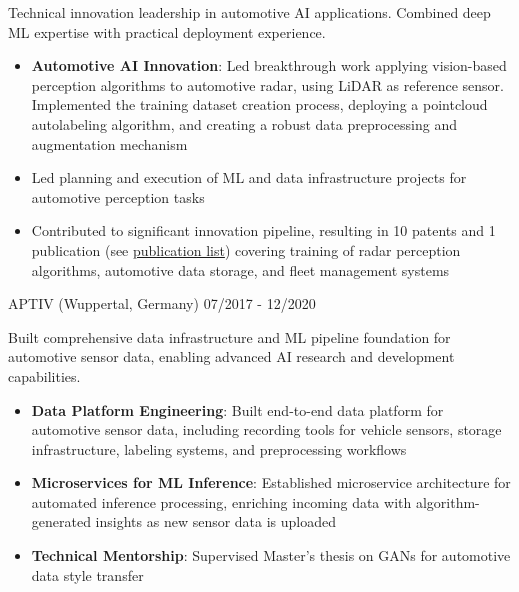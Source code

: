 \documentclass[singlesided,
               paper=a4,
               fontsize=10pt
              ]{my-resume}
\begin{document}
    {
        Technical innovation leadership in automotive AI applications. Combined deep ML expertise with practical deployment experience.
        \begin{itemize}[leftmargin=2em]
            \item \textbf{Automotive AI Innovation}: Led breakthrough work applying vision-based perception algorithms to automotive radar, using LiDAR as reference sensor. Implemented the training dataset creation process, deploying a pointcloud autolabeling algorithm, and creating a robust data preprocessing and augmentation mechanism
            \item Led planning and execution of ML and data infrastructure projects for automotive perception tasks
            \item Contributed to significant innovation pipeline, resulting in 10 patents and 1 publication (see \href{https://scholar.google.com/citations?hl=de&user=MnU8ZxwAAAAJ}{publication list}) covering training of radar perception algorithms, automotive data storage, and fleet management systems
        \end{itemize}
    }
%
    {APTIV (Wuppertal, Germany)}
    {07/2017 - 12/2020}
    {
        Built comprehensive data infrastructure and ML pipeline foundation for automotive sensor data, enabling advanced AI research and development capabilities.
        \begin{itemize}[leftmargin=2em]
            \item \textbf{Data Platform Engineering}: Built end-to-end data platform for automotive sensor data, including recording tools for vehicle sensors, storage infrastructure, labeling systems, and preprocessing workflows
            \item \textbf{Microservices for ML Inference}: Established microservice architecture for automated inference processing, enriching incoming data with algorithm-generated insights as new sensor data is uploaded
            \item \textbf{Technical Mentorship}: Supervised Master's thesis on GANs for automotive data style transfer
        \end{itemize}
    }
\end{document}
